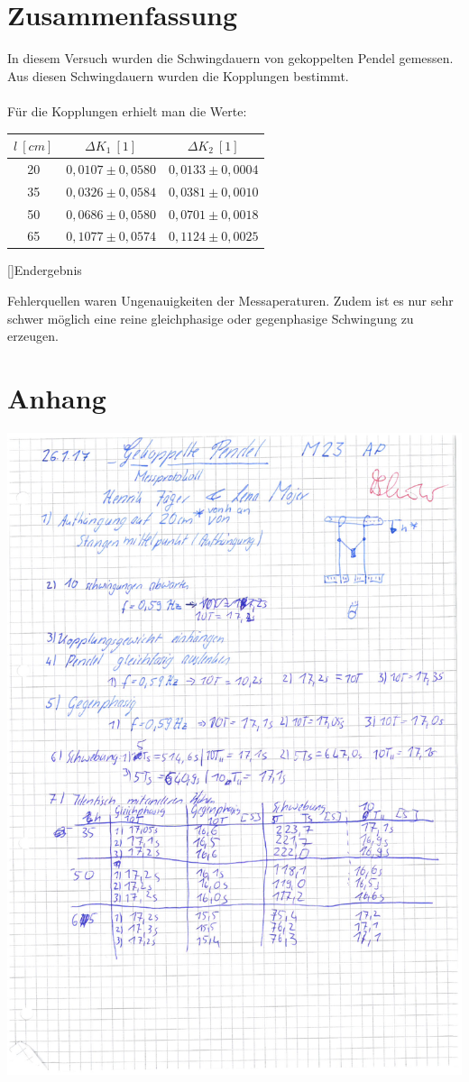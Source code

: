 \documentclass[12pt,a4paper,]{scrreprt}
\begin{document}
	\chapter{Zusammenfassung}
    In diesem Versuch wurden die Schwingdauern von gekoppelten Pendel gemessen. Aus diesen Schwingdauern wurden die Kopplungen bestimmt.\\
    \\
    Für die Kopplungen erhielt man die Werte:
    \begin{center}
    \begin{tabular}{c||c|c}
     $l~[cm] $& $\Delta K_1~[1]$ & $\Delta K_2~[1]$ \\ \hline \hline
	20&$0,0107\pm 0,0580$&$0,0133\pm0,0004$\\
	35&$0,0326\pm 0,0584$&$0,0381\pm0,0010$\\
	50&$0,0686\pm 0,0580$&$0,0701\pm0,0018$\\
	65&$0,1077\pm 0,0574$&$0,1124\pm0,0025$\\
   \end{tabular}
   []{Endergebnis}
    \end{center}
   
Fehlerquellen waren Ungenauigkeiten der Messaperaturen. Zudem ist es nur sehr schwer möglich eine reine gleichphasige oder gegenphasige Schwingung zu erzeugen.

	\chapter{Anhang}
    \includegraphics[scale=0.75]{1.pdf}
	\pagebreak
\end{document}
